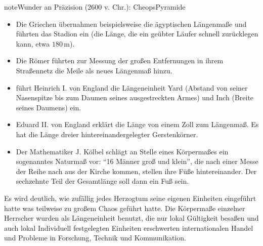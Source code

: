 \documentclass[letterpaper,10pt,english]{jupyterBook}
\begin{document}
\begin{sphinxadmonition}{note}{Wunder an Präzision (2600 v. Chr.): Cheops\sphinxhyphen{}Pyramide}
\begin{itemize}
\item {} 
\sphinxAtStartPar
Die Griechen übernahmen beispielsweise die ägyptischen Längenmaße und führten das Stadion ein (die Länge, die ein geübter Läufer schnell zurücklegen kann, etwa \(180\,\mathrm m\)).

\item {} 
\sphinxAtStartPar
Die Römer führten zur Messung der großen Entfernungen in ihrem Straßennetz die Meile als neues Längenmaß hinzu.

\item {} 
 führt Heinrich I. von England die Längeneinheit Yard (Abstand von seiner Nasenspitze bis zum Daumen seines ausgestreckten Armes) und Inch (Breite seines Daumens) ein.

\item {} 
\sphinxAtStartPar
Eduard II. von England erklärt die Länge von einem Zoll zum Längenmaß. Es hat die Länge dreier hintereinandergelegter Gerstenkörner.

\item {} 
\sphinxAtStartPar
Der Mathematiker J. Kölbel schlägt an Stelle eines Körpermaßes ein sogenanntes Naturmaß vor: “16 Männer groß und klein”, die nach einer Messe der Reihe nach aus der Kirche kommen, stellen ihre Füße hintereinander. Der sechzehnte Teil der Gesamtlänge soll dann ein Fuß sein.

\end{itemize}
\end{sphinxadmonition}

\sphinxAtStartPar
Es wird deutlich, wie zufällig jedes Herzogtum seine eigenen Einheiten eingeführt hatte was teilweise zu großem Chaos geführt hatte.
Die Körpermaße einzelner Herrscher wurden als Längeneinheit benutzt, die nur lokal Gültigkeit besaßen und auch lokal Individuell festgelegten Einheiten erschwerten internationalen Handel und Probleme in Forschung, Technik und Kommunikation.
\end{document}
